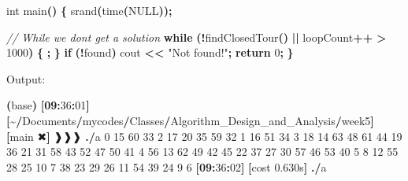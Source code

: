 \documentclass[
]{article}
\newenvironment{Shaded}{\begin{snugshade}}{\end{snugshade}}
\newcommand{\BaseNTok}[1]{\textcolor[rgb]{0.00,0.00,0.81}{#1}}
\newcommand{\BuiltInTok}[1]{#1}
\newcommand{\CommentTok}[1]{\textcolor[rgb]{0.56,0.35,0.01}{\textit{#1}}}
\newcommand{\ControlFlowTok}[1]{\textcolor[rgb]{0.13,0.29,0.53}{\textbf{#1}}}
\newcommand{\DataTypeTok}[1]{\textcolor[rgb]{0.13,0.29,0.53}{#1}}
\newcommand{\DecValTok}[1]{\textcolor[rgb]{0.00,0.00,0.81}{#1}}
\newcommand{\ErrorTok}[1]{\textcolor[rgb]{0.64,0.00,0.00}{\textbf{#1}}}
\newcommand{\FloatTok}[1]{\textcolor[rgb]{0.00,0.00,0.81}{#1}}
\newcommand{\NormalTok}[1]{#1}
\newcommand{\OperatorTok}[1]{\textcolor[rgb]{0.81,0.36,0.00}{\textbf{#1}}}
\newcommand{\StringTok}[1]{\textcolor[rgb]{0.31,0.60,0.02}{#1}}
\begin{document}
\begin{Shaded}
\begin{Highlighting}[]
\DataTypeTok{int}\NormalTok{ main}\OperatorTok{()}
\OperatorTok{\{}
\NormalTok{    srand}\OperatorTok{(}\NormalTok{time}\OperatorTok{(}\NormalTok{NULL}\OperatorTok{));}

    \CommentTok{// While we don\textquotesingle{}t get a solution}
    \ControlFlowTok{while} \OperatorTok{(!}\NormalTok{findClosedTour}\OperatorTok{()} \OperatorTok{||}\NormalTok{ loopCount}\OperatorTok{++} \OperatorTok{\textgreater{}} \DecValTok{1000}\OperatorTok{)}
    \OperatorTok{\{}
    \OperatorTok{;}
    \OperatorTok{\}}
    \ControlFlowTok{if} \OperatorTok{(!}\NormalTok{found}\OperatorTok{)}\NormalTok{ cout }\OperatorTok{\textless{}\textless{}} \StringTok{"Not found!"}\OperatorTok{;}
    \ControlFlowTok{return} \DecValTok{0}\OperatorTok{;}
\OperatorTok{\}}
\end{Highlighting}
\end{Shaded}

Output:

\begin{Shaded}
\begin{Highlighting}[]
\OperatorTok{(}\NormalTok{base}\OperatorTok{)} \OperatorTok{[}\ErrorTok{09}\OperatorTok{:}\DecValTok{36}\OperatorTok{:}\BaseNTok{01}\OperatorTok{]} \OperatorTok{[\textasciitilde{}/}\NormalTok{Documents}\OperatorTok{/}\NormalTok{mycodes}\OperatorTok{/}\NormalTok{Classes}\OperatorTok{/}\NormalTok{Algorithm\_Design\_and\_Analysis}\OperatorTok{/}\NormalTok{week5}\OperatorTok{]} \OperatorTok{[}\NormalTok{main ✖}\OperatorTok{]}\NormalTok{ ❱❱❱ }\OperatorTok{./}\NormalTok{a                                   }
\DecValTok{0} \DecValTok{15} \DecValTok{60} \DecValTok{33} \DecValTok{2} \DecValTok{17} \DecValTok{20} \DecValTok{35}
\DecValTok{59} \DecValTok{32} \DecValTok{1} \DecValTok{16} \DecValTok{51} \DecValTok{34} \DecValTok{3} \DecValTok{18}
\DecValTok{14} \DecValTok{63} \DecValTok{48} \DecValTok{61} \DecValTok{44} \DecValTok{19} \DecValTok{36} \DecValTok{21}
\DecValTok{31} \DecValTok{58} \DecValTok{43} \DecValTok{52} \DecValTok{47} \DecValTok{50} \DecValTok{41} \DecValTok{4}
\DecValTok{56} \DecValTok{13} \DecValTok{62} \DecValTok{49} \DecValTok{42} \DecValTok{45} \DecValTok{22} \DecValTok{37}
\DecValTok{27} \DecValTok{30} \DecValTok{57} \DecValTok{46} \DecValTok{53} \DecValTok{40} \DecValTok{5} \DecValTok{8}
\DecValTok{12} \DecValTok{55} \DecValTok{28} \DecValTok{25} \DecValTok{10} \DecValTok{7} \DecValTok{38} \DecValTok{23}
\DecValTok{29} \DecValTok{26} \DecValTok{11} \DecValTok{54} \DecValTok{39} \DecValTok{24} \DecValTok{9} \DecValTok{6}
\OperatorTok{[}\ErrorTok{09}\OperatorTok{:}\DecValTok{36}\OperatorTok{:}\BaseNTok{02}\OperatorTok{]} \OperatorTok{[}\NormalTok{cost }\FloatTok{0.630}\BuiltInTok{s}\OperatorTok{]} \OperatorTok{./}\NormalTok{a}
\end{Highlighting}
\end{Shaded}
\end{document}
